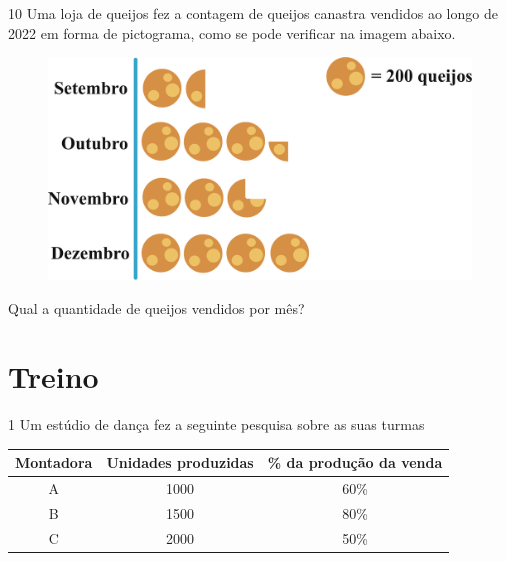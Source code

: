 
\num{10} Uma loja de queijos fez a contagem de queijos canastra vendidos ao
longo de 2022 em forma de pictograma, como se pode verificar na imagem abaixo. 

\begin{figure}[htpb!]
\centering
\includegraphics[width=\textwidth]{./ilustras-mat/modulo_13-atividade_10.png}
\end{figure}

Qual a quantidade de queijos vendidos por mês?


\section{Treino}

\num{1}
  Um estúdio de dança fez a seguinte pesquisa sobre as suas turmas 

\begin{center}
\begin{tabular}{c|c|c}
\hline
\multicolumn{1}{|c|}{\textbf{Montadora}} & \textbf{Unidades produzidas} & \multicolumn{1}{c|}{\textbf{\% da produção da venda}} \\ \hline
A & 1000 & 60\% \\ \hline
B & 1500 & 80\% \\ \hline
C & 2000 & 50\% \\ \hline
\end{tabular}
\end{center}


